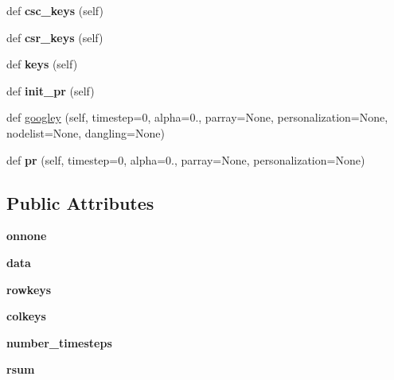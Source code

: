 \begin{DoxyCompactItemize}
def {\bfseries csc\+\_\+keys} (self)
\item 
\mbox{\label{classSTPR_1_1Sparse3D_aee461121029774a17fe6eea8d4dcce2b}} 
def {\bfseries csr\+\_\+keys} (self)
\item 
\mbox{\label{classSTPR_1_1Sparse3D_a6525586a402855d4b5cd4ad959eee8f5}} 
def {\bfseries keys} (self)
\item 
\mbox{\label{classSTPR_1_1Sparse3D_a6aef3cae71b24581e1d517192a50740d}} 
def {\bfseries init\+\_\+pr} (self)
\item 
def \mbox{\hyperlink{classSTPR_1_1Sparse3D_add417073a46122cadb2c720840deec12}{googley}} (self, timestep=0, alpha=0., parray=None, personalization=None, nodelist=None, dangling=None)
\item 
\mbox{\label{classSTPR_1_1Sparse3D_aa784d6697a021aa40afc4115b430740c}} 
def {\bfseries pr} (self, timestep=0, alpha=0., parray=None, personalization=None)
\end{DoxyCompactItemize}
\subsection*{Public Attributes}
\begin{DoxyCompactItemize}
\item 
\mbox{\label{classSTPR_1_1Sparse3D_aa0d4db1227bc48980a6347c6dbcd7db0}} 
{\bfseries onnone}
\item 
\mbox{\label{classSTPR_1_1Sparse3D_a21f2680bd7dc93ded2d7236a9f442edc}} 
{\bfseries data}
\item 
\mbox{\label{classSTPR_1_1Sparse3D_af63baac06c0f65d7e90c1ff08f2589c3}} 
{\bfseries rowkeys}
\item 
\mbox{\label{classSTPR_1_1Sparse3D_af441c649424bce52b649b2c3c3de5c9c}} 
{\bfseries colkeys}
\item 
\mbox{\label{classSTPR_1_1Sparse3D_a0546515d650529c52de56abcf2dd4e39}} 
{\bfseries number\+\_\+timesteps}
\item 
\mbox{\label{classSTPR_1_1Sparse3D_ac6f9ddcdf3fa051c64feb14ec111b16e}} 
{\bfseries rsum}
\end{DoxyCompactItemize}
